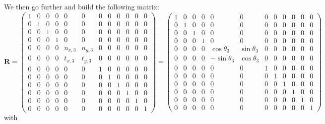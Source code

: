 We then go further and build the following matrix:
\[
{\bm R}=
\left(\begin{array}{cccccccccccc}
1 & 0 & 0 & 0 & 0 & 0 & 0 & 0 &  0 & 0 & 0 & 0 \\
0 & 1 & 0 & 0 & 0 & 0 & 0 & 0 &  0 & 0 & 0 & 0 \\
0 & 0 & 1 & 0 & 0 & 0 & 0 & 0 &  0 & 0 & 0 & 0 \\
0 & 0 & 0 & 1 & 0 & 0 & 0 & 0 &  0 & 0 & 0 & 0 \\
0 & 0 & 0 & 0 & n_{x,3} & n_{y,3} & 0 & 0 &  0 & 0 & 0 & 0 \\
0 & 0 & 0 & 0 & t_{x,3} & t_{y,3} & 0 & 0 &  0 & 0 & 0 & 0 \\
0 & 0 & 0 & 0 & 0 & 0 & 1 & 0 &  0 & 0 & 0 & 0 \\
0 & 0 & 0 & 0 & 0 & 0 & 0 & 1 &  0 & 0 & 0 & 0 \\
0 & 0 & 0 & 0 & 0 & 0 & 0 & 0 & 1 & 0 & 0 & 0 \\
0 & 0 & 0 & 0 & 0 & 0 & 0 & 0 & 0 & 1 & 0 & 0 \\
0 & 0 & 0 & 0 & 0 & 0 & 0 & 0 & 0 & 0 & 1 & 0 \\
0 & 0 & 0 & 0 & 0 & 0 & 0 & 0 & 0 & 0 & 0 & 1
\end{array} \right)
=
\left(\begin{array}{cccccccccccc}
1 & 0 & 0 & 0 & 0 & 0 & 0 & 0 &  0 & 0 & 0 & 0 \\
0 & 1 & 0 & 0 & 0 & 0 & 0 & 0 &  0 & 0 & 0 & 0 \\
0 & 0 & 1 & 0 & 0 & 0 & 0 & 0 &  0 & 0 & 0 & 0 \\
0 & 0 & 0 & 1 & 0 & 0 & 0 & 0 &  0 & 0 & 0 & 0 \\
0 & 0 & 0 & 0 & \cos\theta_3 & \sin\theta_3 & 0 & 0 &  0 & 0 & 0 & 0 \\
0 & 0 & 0 & 0 & -\sin\theta_3 & \cos\theta_3 & 0 & 0 &  0 & 0 & 0 & 0 \\
0 & 0 & 0 & 0 & 0 & 0 & 1 & 0 &  0 & 0 & 0 & 0 \\
0 & 0 & 0 & 0 & 0 & 0 & 0 & 1 &  0 & 0 & 0 & 0 \\
0 & 0 & 0 & 0 & 0 & 0 & 0 & 0 & 1 & 0 & 0 & 0 \\
0 & 0 & 0 & 0 & 0 & 0 & 0 & 0 & 0 & 1 & 0 & 0 \\
0 & 0 & 0 & 0 & 0 & 0 & 0 & 0 & 0 & 0 & 1 & 0 \\
0 & 0 & 0 & 0 & 0 & 0 & 0 & 0 & 0 & 0 & 0 & 1
\end{array} \right)
\]
with 

